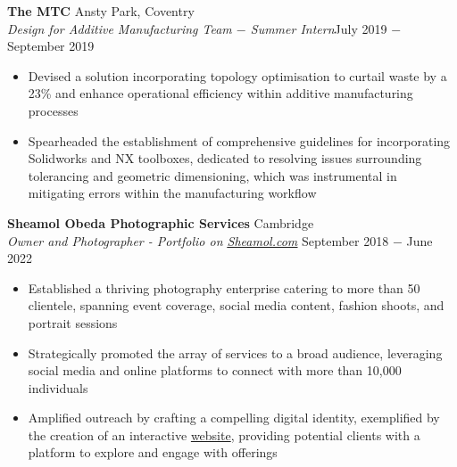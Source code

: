 \documentclass{article}
\begin{document}
\textbf{The MTC} \hfill Ansty Park, Coventry \\
\textit{Design for Additive Manufacturing Team $-$ Summer Intern}\hfill July 2019 $-$ September 2019
\begin{itemize}
    \item Devised a solution incorporating topology optimisation to curtail waste by a 23\% and enhance operational efficiency within additive manufacturing processes
    \item Spearheaded the establishment of comprehensive guidelines for incorporating Solidworks and NX toolboxes, dedicated to resolving issues surrounding tolerancing and geometric dimensioning, which was instrumental in mitigating errors within the manufacturing workflow
\end{itemize} \medskip

\textbf{Sheamol Obeda Photographic Services} \hfill Cambridge\\
\textit{Owner and Photographer - Portfolio on \href{www.sheamol.com}{\underline{Sheamol.com}}} \hfill September 2018 $-$ June 2022
\begin{itemize}
    \item Established a thriving photography enterprise catering to more than 50 clientele, spanning event coverage, social media content, fashion shoots, and portrait sessions
    \item Strategically promoted the array of services to a broad audience, leveraging social media and online platforms to connect with more than 10,000 individuals
    \item Amplified outreach by crafting a compelling digital identity, exemplified by the creation of an interactive \href{www.sheamol.com}{website}, providing potential clients with a platform to explore and engage with offerings
\end{itemize} \medskip

\end{document}
